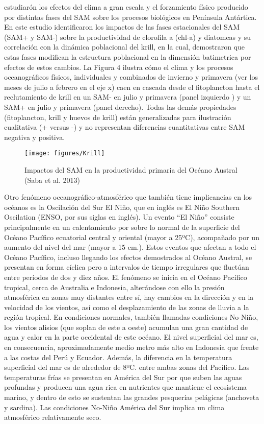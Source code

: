 \documentclass{umagthesis}
\begin{document}
\autocite{Saba2014} estudiarón los efectos del clima a gran escala y el forzamiento físico producido por distintas fases del SAM sobre los procesos biológicos en Península Antártica. En este estudio identificaron los impactos de las fases estacionales del SAM (SAM+ y SAM-) sobre la productividad de clorofila a (chl-a) y diatomeas y su correlación con la dinámica poblacional del krill, en la cual, demostraron que estas fases modifican la estructura poblacional en la dimensión batimetrica por efectos de estos cambios. La Figura 4 ilustra cómo el clima y los procesos oceanográficos físicos, individuales y combinados de invierno y primavera (ver los meses de julio a febrero en el eje x) caen en cascada desde el fitoplancton hasta el reclutamiento de krill en un SAM- en julio y primavera (panel izquierdo ) y un SAM+ en julio y primavera (panel derecho). Todas las demás propiedades (fitoplancton, krill y huevos de krill) están generalizadas para ilustración cualitativa (+ versus -) y no representan diferencias cuantitativas entre SAM negativa y positiva.

\begin{figure}

{\centering \texttt{[image: figures/Krill]} 

}

\caption{Impactos del SAM en la productividad primaria del Océano Austral (Saba et al. 2013)}\label{fig:unnamed-chunk-4}
\end{figure}

Otro fenómeno oceanográfico-atmosférico que también tiene implicancias en los océanos es la Oscilación del Sur El Niño, que en inglés es El Niño Southern Oscilation (ENSO, por sus siglas en inglés). Un evento ``El Niño'' consiste principalmente en un calentamiento por sobre lo normal de la superficie del Océano Pacífico ecuatorial central y oriental (mayor a 25ºC), acompañado por un aumento del nivel del mar (mayor a 15 cm.). Estos eventos que afectan a todo el Océano Pacífico, incluso llegando los efectos demostrados al Océano Austral, se presentan en forma cíclica pero a intervalos de tiempo irregulares que fluctúan entre períodos de dos y diez años. El fenómeno se inicia en el Océano Pacífico tropical, cerca de Australia e Indonesia, alterándose con ello la presión atmosférica en zonas muy distantes entre sí, hay cambios en la dirección y en la velocidad de los vientos, así como el desplazamiento de las zonas de lluvia a la región tropical. En condiciones normales, también llamadas condiciones No-Niño, los vientos alisios (que soplan de este a oeste) acumulan una gran cantidad de agua y calor en la parte occidental de este océano. El nivel superficial del mar es, en consecuencia, aproximadamente medio metro más alto en Indonesia que frente a las costas del Perú y Ecuador. Además, la diferencia en la temperatura superficial del mar es de alrededor de 8ºC. entre ambas zonas del Pacífico. Las temperaturas frías se presentan en América del Sur por que suben las aguas profundas y producen una agua rica en nutrientes que mantiene el ecosistema marino, y dentro de esto se sustentan las grandes pesquerías pelágicas (anchoveta y sardina). Las condiciones No-Niño América del Sur implica un clima atmosférico relativamente seco.
\end{document}
